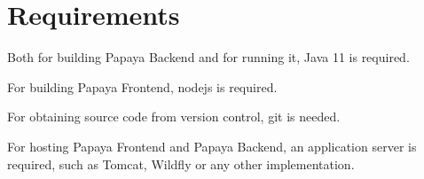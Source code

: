 \section{Requirements}\label{sec:requirements}

Both for building Papaya Backend and for running it,
Java 11 is required.

For building Papaya Frontend, nodejs is required.

For obtaining source code from version control, git is needed.

For hosting Papaya Frontend and Papaya Backend, an application server is
required, such as Tomcat, Wildfly or any other implementation.
